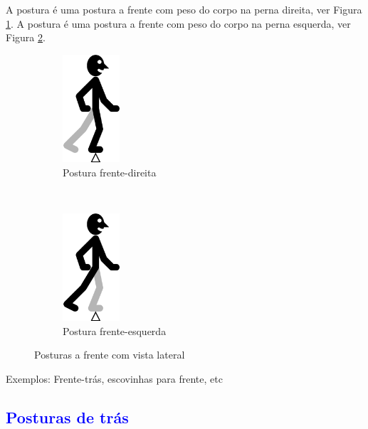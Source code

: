 A postura  é uma postura a frente com peso do corpo na perna direita, ver Figura \ref{fig:frentedireita}.
A postura  é uma postura a frente com peso do corpo na perna esquerda, ver Figura \ref{fig:frenteesquerda}.
\begin{figure}[H]
    \centering
    \begin{subfigure}[b]{0.3\textwidth}
        \includegraphics[height=4cm]{chapters/cap-posturas/postura-ft-frente-der.eps}
        \caption{Postura frente-direita}
        \label{fig:frentedireita}
    \end{subfigure}
    ~ %
    \begin{subfigure}[b]{0.3\textwidth}
        \includegraphics[height=4cm]{chapters/cap-posturas/postura-ft-frente-esq.eps}
        \caption{Postura frente-esquerda}
        \label{fig:frenteesquerda}
    \end{subfigure}
    \caption{Posturas a frente  com vista lateral}\label{fig:frentederesq}
\end{figure}

Exemplos: Frente-trás, escovinhas para frente, etc


\subsection{\textcolor{blue}{ Posturas de  trás}}


